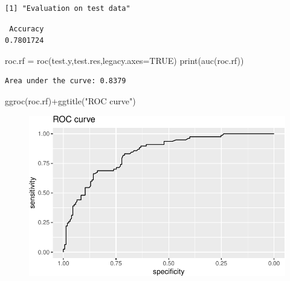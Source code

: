 \documentclass[
  letterpaper,
  DIV=11,
  numbers=noendperiod]{scrartcl}
\newenvironment{Shaded}{\begin{snugshade}}{\end{snugshade}}
\newcommand{\AttributeTok}[1]{\textcolor[rgb]{0.40,0.45,0.13}{#1}}
\newcommand{\ConstantTok}[1]{\textcolor[rgb]{0.56,0.35,0.01}{#1}}
\newcommand{\DecValTok}[1]{\textcolor[rgb]{0.68,0.00,0.00}{#1}}
\newcommand{\FunctionTok}[1]{\textcolor[rgb]{0.28,0.35,0.67}{#1}}
\newcommand{\NormalTok}[1]{\textcolor[rgb]{0.00,0.23,0.31}{#1}}
\newcommand{\OtherTok}[1]{\textcolor[rgb]{0.00,0.23,0.31}{#1}}
\newcommand{\SpecialCharTok}[1]{\textcolor[rgb]{0.37,0.37,0.37}{#1}}
\newcommand{\StringTok}[1]{\textcolor[rgb]{0.13,0.47,0.30}{#1}}
\begin{document}
\begin{verbatim}
[1] "Evaluation on test data"
\end{verbatim}

\begin{Shaded}
\end{Shaded}

\begin{verbatim}
 Accuracy 
0.7801724 
\end{verbatim}

\begin{Shaded}
\begin{Highlighting}[]
\NormalTok{roc.rf }\OtherTok{=} \FunctionTok{roc}\NormalTok{(test.y,test.res,}\AttributeTok{legacy.axes=}\ConstantTok{TRUE}\NormalTok{)}
\FunctionTok{print}\NormalTok{(}\FunctionTok{auc}\NormalTok{(roc.rf))}
\end{Highlighting}
\end{Shaded}

\begin{verbatim}
Area under the curve: 0.8379
\end{verbatim}

\begin{Shaded}
\begin{Highlighting}[]
\FunctionTok{ggroc}\NormalTok{(roc.rf)}\SpecialCharTok{+}\FunctionTok{ggtitle}\NormalTok{(}\StringTok{"ROC curve"}\NormalTok{)}
\end{Highlighting}
\end{Shaded}

\begin{figure}[H]

{\centering \includegraphics{L13_files/figure-pdf/unnamed-chunk-23-1.pdf}

}

\end{figure}
\end{document}
